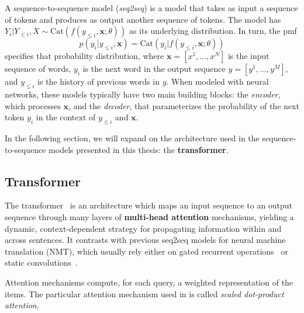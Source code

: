 \begin{definition}
    A sequence-to-sequence model (\textit{seq2seq}) is a model that takes as input a
    sequence of tokens and produces as output another sequence of tokens.
    The model has $Y_i | Y_{\leq i}, X \sim \text{Cat}(f(y_{\leq i}, \bm{x};
        \theta))$ as its underlying distribution. In turn, the pmf
    \begin{equation}
        p(y_i|y_{\leq i}, \bm{x}) = \text{Cat}(y_i|f(y_{\leq i}, \bm{x}; \theta))
    \end{equation}
    specifies that probability distribution, where
    $\bm{x}=[x^1, \dots, x^N]$ is the input sequence of words,
    $y_i$ is the next word in the output sequence $y=[y^1, \dots, y^M]$,
    and $y_{\leq i}$ is the history of previous words in $y$.
    When modeled with neural networks, these models typically have
    two main building blocks: the \textit{encoder}, which processes $\bm{x}$,
    and the \textit{decoder}, that parameterizes the probability of the next
    token $y_i$ in the context of $y_{\leq i}$ and $\bm{x}$.
\end{definition}

In the following section, we will expand on the architecture used in
the sequence-to-sequence models presented in this thesis: the \textbf{transformer}.

\subsection{Transformer}
\label{sec:transformer_bg}

\noindent The transformer~\citep{vaswani2017attention} is an architecture which
maps an input sequence to an output sequence through many layers of
\textbf{multi-head attention} mechanisms, yielding a dynamic,
context-dependent strategy for propagating information within and
across sentences. It contrasts with previous seq2seq models for neural machine translation (NMT), which
usually rely either on gated recurrent operations~\citep[often
    LSTMs:][]{bahdanau2014neural,luong2015effective} or static
convolutions~\citep{convseq}.

Attention mechanisms compute, for each query, a weighted
representation of the items. The particular attention mechanism used
in \citet{vaswani2017attention} is called \emph{scaled dot-product
    attention}.

